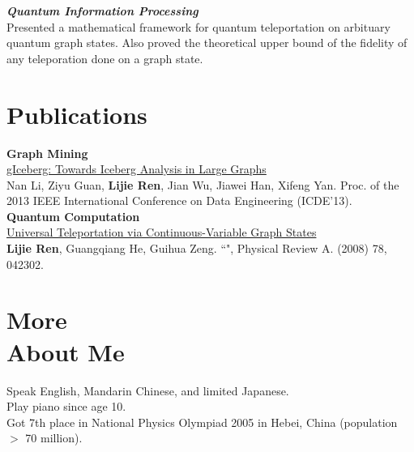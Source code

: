 \documentclass[margin,line]{res}
\begin{document}
\begin{resume}
\vspace*{-.1in}
{\bf{\em Quantum Information Processing}}\\
Presented a mathematical framework for quantum teleportation on arbituary quantum graph states. Also proved the theoretical upper bound of the fidelity of any teleporation done on a graph state.

\section{\sc Publications}
\vspace{-.1cm}
{\bf Graph Mining}\\
\href{https://drive.google.com/open?id=1TMkCJGdvBT6-96O487QWsjsFdTMqDxQT}{gIceberg: Towards Iceberg Analysis in Large Graphs}\\
Nan Li, Ziyu Guan, {\bf{Lijie Ren}}, Jian Wu, Jiawei Han, Xifeng Yan. Proc. of the 2013 IEEE International Conference on Data Engineering (ICDE'13).\\

\vspace*{-.1in}
{\bf Quantum Computation}\\
\href{https://drive.google.com/open?id=16mw5QziHqvVJCKmDTiCaopSsf2f-zJYy}{Universal Teleportation via Continuous-Variable Graph States}\\
{\bf{Lijie Ren}}, Guangqiang He, Guihua Zeng. ``", Physical Review A. (2008) 78, 042302.\\

\vspace{-.1cm}

\section{\sc More \\About Me}
Speak English, Mandarin Chinese, and limited Japanese.\\
Play piano since age 10.\\
Got 7th place in National Physics Olympiad 2005 in Hebei, China (population $>$ 70 million).

\end{resume}
\end{document}
